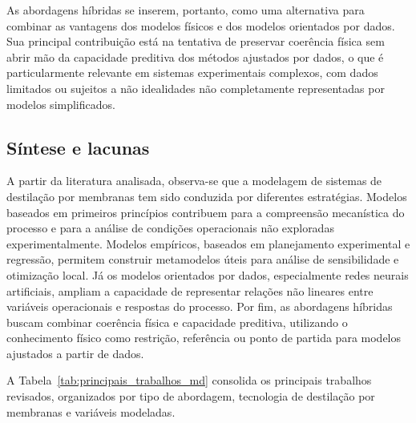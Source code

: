 As abordagens híbridas se inserem, portanto, como uma alternativa para combinar as vantagens dos modelos físicos e dos modelos orientados por dados. Sua principal contribuição está na tentativa de preservar coerência física sem abrir mão da capacidade preditiva dos métodos ajustados por dados, o que é particularmente relevante em sistemas experimentais complexos, com dados limitados ou sujeitos a não idealidades não completamente representadas por modelos simplificados.

\subsection{Síntese e lacunas}

A partir da literatura analisada, observa-se que a modelagem de sistemas de destilação por membranas tem sido conduzida por diferentes estratégias. Modelos baseados em primeiros princípios contribuem para a compreensão mecanística do processo e para a análise de condições operacionais não exploradas experimentalmente. Modelos empíricos, baseados em planejamento experimental e regressão, permitem construir metamodelos úteis para análise de sensibilidade e otimização local. Já os modelos orientados por dados, especialmente redes neurais artificiais, ampliam a capacidade de representar relações não lineares entre variáveis operacionais e respostas do processo. Por fim, as abordagens híbridas buscam combinar coerência física e capacidade preditiva, utilizando o conhecimento físico como restrição, referência ou ponto de partida para modelos ajustados a partir de dados.

A Tabela~\ref{tab:principais_trabalhos_md} consolida os principais trabalhos revisados, organizados por tipo de abordagem, tecnologia de destilação por membranas e variáveis modeladas.

